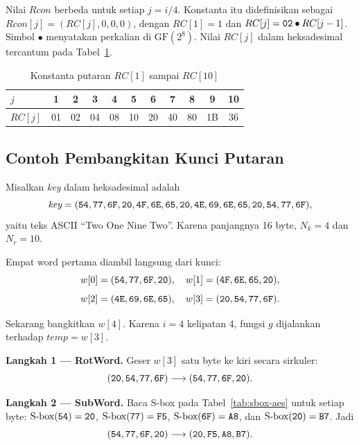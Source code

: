 Nilai $Rcon$ berbeda untuk setiap $j = i/4$. Konstanta itu didefinisikan sebagai
$Rcon[j] = (RC[j], 0, 0, 0)$, dengan $RC[1] = 1$ dan
$RC[j] = \texttt{02} \bullet RC[j-1]$. Simbol $\bullet$ menyatakan perkalian di
$\text{GF}(2^8)$. Nilai $RC[j]$ dalam heksadesimal tercantum pada
Tabel~\ref{tab:rcon-aes}.

\begin{table}[htbp]
\centering
\caption{Konstanta putaran $RC[1]$ sampai $RC[10]$}
\label{tab:rcon-aes}
\small
\begin{tabular}{@{}l *{10}{c}@{}}
\hline
$j$ & 1 & 2 & 3 & 4 & 5 & 6 & 7 & 8 & 9 & 10 \\
\hline
$RC[j]$ & 01 & 02 & 04 & 08 & 10 & 20 & 40 & 80 & 1B & 36 \\
\hline
\end{tabular}
\end{table}



\subsection{Contoh Pembangkitan Kunci Putaran}

Misalkan \textit{key} dalam heksadesimal adalah
\[
\textit{key} = (\texttt{54}, \texttt{77}, \texttt{6F}, \texttt{20}, \texttt{4F}, \texttt{6E},
\texttt{65}, \texttt{20}, \texttt{4E}, \texttt{69}, \texttt{6E}, \texttt{65}, \texttt{20},
\texttt{54}, \texttt{77}, \texttt{6F}),
\]
yaitu teks ASCII ``Two One Nine Two''. Karena panjangnya 16 byte, $N_k = 4$ dan
$N_r = 10$.

Empat word pertama diambil langsung dari kunci:
\[
w[0] = (\texttt{54},\texttt{77},\texttt{6F},\texttt{20}), \quad
w[1] = (\texttt{4F},\texttt{6E},\texttt{65},\texttt{20}),
\]
\[
w[2] = (\texttt{4E},\texttt{69},\texttt{6E},\texttt{65}), \quad
w[3] = (\texttt{20},\texttt{54},\texttt{77},\texttt{6F}).
\]

Sekarang bangkitkan $w[4]$. Karena $i = 4$ kelipatan 4, fungsi $g$ dijalankan
terhadap $\textit{temp} = w[3]$.

\textbf{Langkah 1 --- RotWord.} Geser $w[3]$ satu byte ke kiri secara sirkuler:
\[
(\texttt{20},\texttt{54},\texttt{77},\texttt{6F})
\longrightarrow
(\texttt{54},\texttt{77},\texttt{6F},\texttt{20}).
\]

\textbf{Langkah 2 --- SubWord.} Baca S-box pada Tabel~\ref{tab:sbox-aes} untuk
setiap byte: $\text{S-box}(\texttt{54}) = \texttt{20}$,
$\text{S-box}(\texttt{77}) = \texttt{F5}$,
$\text{S-box}(\texttt{6F}) = \texttt{A8}$, dan
$\text{S-box}(\texttt{20}) = \texttt{B7}$. Jadi
\[
(\texttt{54},\texttt{77},\texttt{6F},\texttt{20})
\longrightarrow
(\texttt{20},\texttt{F5},\texttt{A8},\texttt{B7}).
\]

